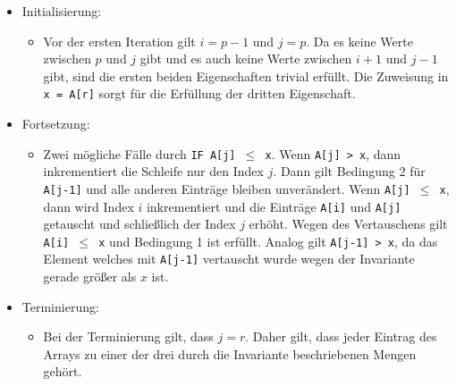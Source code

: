 \begin{itemize}
\begin{itemize}
                \item Initialisierung:
                    \begin{itemize}
                        \item[]
                            Vor der ersten Iteration gilt $i = p - 1$ und $j = p$. Da es keine Werte zwischen $p$ und $j$
                            gibt und es auch keine Werte zwischen $i + 1$ und $j - 1$ gibt, sind die ersten beiden Eigenschaften
                            trivial erfüllt. Die Zuweisung in \texttt{x = A[r]} sorgt für die Erfüllung der dritten Eigenschaft.
                    \end{itemize}
                
                \item Fortsetzung:
                    \begin{itemize}
                        \item[]
                            Zwei mögliche Fälle durch \texttt{IF A[j] $\leq$ x}. Wenn \texttt{A[j] > x}, dann inkrementiert die 
                            Schleife nur den Index $j$. Dann gilt Bedingung 2 für \texttt{A[j-1]} und alle anderen Einträge
                            bleiben unverändert. Wenn \texttt{A[j] $\leq$ x}, dann wird Index $i$ inkrementiert und die 
                            Einträge \texttt{A[i]} und \texttt{A[j]} getauscht und schließlich der Index $j$ erhöht. Wegen
                            des Vertauschens gilt \texttt{A[i] $\leq$ x} und Bedingung 1 ist erfüllt. Analog gilt
                            \texttt{A[j-1] > x}, da das Element welches mit \texttt{A[j-1]} vertauscht wurde wegen der 
                            Invariante gerade größer als $x$ ist.
                    \end{itemize}

                \item Terminierung:
                    \begin{itemize}
                        \item[]
                            Bei der Terminierung gilt, dass $j = r$. Daher gilt, dass jeder Eintrag des Arrays zu einer der drei 
                            durch die Invariante beschriebenen Mengen gehört.
                    \end{itemize}
            \end{itemize}


\end{itemize}
